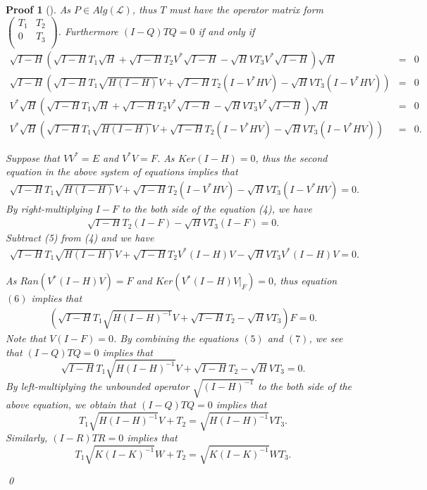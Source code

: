 \documentclass{jaums}
\theoremstyle{thmit} %
\theoremstyle{thmrm} %
\newtheorem*{oldproof}{Proof}
\renewenvironment{proof}[1][{}]{\begin{oldproof}[#1]}{\qed\end{oldproof}}
\begin{document}
\begin{proof} As $P\in Alg(\mathcal{L})$, thus $T$ must have the operator matrix
form
$\left(
\begin{array}{cc}
T_1 & T_2 \\
0   & T_3 \\
\end{array}
\right)$. Furthermore $(I-Q)TQ=0$ if and only if
\begin{eqnarray*}
  \sqrt{I-H}(\sqrt{I-H}T_1\sqrt{H}+\sqrt{I-H}T_2V^*\sqrt{I-H}-
\sqrt{H}VT_3V^*\sqrt{I-H})\sqrt{H} &=& 0 \\
  \sqrt{I-H}(\sqrt{I-H}T_1\sqrt{H(I-H)}V+\sqrt{I-H}T_2(I-V^*HV)-
\sqrt{H}VT_3(I-V^*HV)) &=& 0 \\
  V^*\sqrt{H}(\sqrt{I-H}T_1\sqrt{H}+\sqrt{I-H}T_2V^*\sqrt{I-H}-
\sqrt{H}VT_3V^*\sqrt{I-H})\sqrt{H} &=& 0 \\
  V^*\sqrt{H}(\sqrt{I-H}T_1\sqrt{H(I-H)}V+\sqrt{I-H}T_2(I-V^*HV)-
\sqrt{H}VT_3(I-V^*HV)) &=& 0.
\end{eqnarray*}

Suppose that $VV^*=E$ and $V^*V=F$. As $Ker(I-H)=0$, thus the second equation in
the above system of equations implies that
\begin{align}
\sqrt{I-H}T_1\sqrt{H(I-H)}V+\sqrt{I-H}T_2(I-V^*HV)- \sqrt{H}VT_3(I-V^*HV)=0.
\end{align}
By right-multiplying $I-F$ to the both side of the equation (4), we have
\begin{align}
\sqrt{I-H}T_2(I-F)-\sqrt{H}VT_3(I-F) = 0.
\end{align}
Subtract (5) from (4) and we have
\begin{align}
\sqrt{I-H}T_1\sqrt{H(I-H)}V+\sqrt{I-H}T_2V^*(I-H)V-\sqrt{H}VT_3V^*(I-H)V = 0.
\end{align}

As $Ran(V^*(I-H)V)=F$ and $Ker(V^*(I-H)V|_{F})=0$, thus equation $(6)$
implies that
\begin{align}
(\sqrt{I-H}T_1\sqrt{H(I-H)^{-1}}V+\sqrt{I-H}T_2-\sqrt{H}VT_3)F=0.
\end{align}
Note that $V(I-F)=0$. By combining the equations $(5)$ and $(7)$, we see that
$(I-Q)TQ=0$ implies that
$$\sqrt{I-H}T_1\sqrt{H(I-H)^{-1}}V+\sqrt{I-H}T_2-\sqrt{H}VT_3=0.$$
By left-multiplying the unbounded operator $\sqrt{(I-H)^{-1}}$ to the both side
of the above equation,
we obtain that $(I-Q)TQ=0$ implies that
$$T_1\sqrt{H(I-H)^{-1}}V+T_2=\sqrt{H(I-H)^{-1}}VT_3.$$
Similarly, $(I-R)TR=0$ implies that
$$T_1\sqrt{K(I-K)^{-1}}W+T_2=\sqrt{K(I-K)^{-1}}WT_3.$$


\end{proof}
\end{document}
